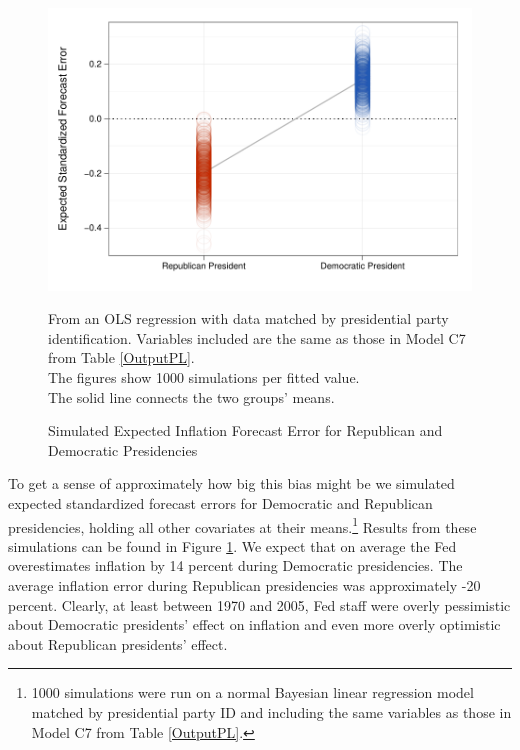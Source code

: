 \documentclass[a4paper]{article}\usepackage{graphicx, color}
\newenvironment{knitrout}{}{} %
\begin{document}
\begin{figure}[t]
    \caption{Simulated Expected Inflation Forecast Error for Republican and Democratic Presidencies}
    \label{ExpectValueParty}
    \begin{center}

\begin{knitrout}
\color{fgcolor}\includegraphics[width=0.7\linewidth]{figure/ExpectValueParty} 
\end{knitrout}

    \end{center}
    \begin{singlespace}
        {\scriptsize{From an OLS regression with data matched by presidential party identification. Variables included are the same as those in Model C7 from Table \ref{OutputPL}. \\ The figures show 1000 simulations per fitted value. \\ The solid line connects the two groups' means.}}
    \end{singlespace}
\end{figure}

To get a sense of approximately how big this bias might be we simulated expected standardized forecast errors for Democratic and Republican presidencies, holding all other covariates at their means.\footnote{1000 simulations were run on a normal Bayesian linear regression model matched by presidential party ID and including the same variables as those in Model C7 from Table \ref{OutputPL}.} Results from these simulations can be found in Figure \ref{ExpectValueParty}. We expect that on average the Fed overestimates inflation by 14 percent during Democratic presidencies. The average inflation error during Republican presidencies was approximately -20 percent. Clearly, at least between 1970 and 2005, Fed staff were overly pessimistic about Democratic presidents' effect on inflation and even more overly optimistic about Republican presidents' effect. 
\end{document}
